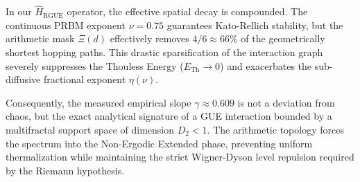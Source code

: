 \documentclass[aps,prl,preprint,superscriptaddress,floatfix]{revtex4-2}
\begin{document}
In our $\hat{H}_{\text{RGUE}}$ operator, the effective spatial decay is compounded. The continuous PRBM exponent $\nu=0.75$ guarantees Kato-Rellich stability, but the arithmetic mask $\Xi(d)$ effectively removes $4/6 \approx 66\%$ of the geometrically shortest hopping paths. This drastic sparsification of the interaction graph severely suppresses the Thouless Energy ($E_{\text{Th}} \to 0$) and exacerbates the sub-diffusive fractional exponent $\eta(\nu)$.

Consequently, the measured empirical slope $\gamma \approx 0.609$ is not a deviation from chaos, but the exact analytical signature of a GUE interaction bounded by a multifractal support space of dimension $D_2 < 1$. The arithmetic topology forces the spectrum into the Non-Ergodic Extended phase, preventing uniform thermalization while maintaining the strict Wigner-Dyson level repulsion required by the Riemann hypothesis.



\end{document}
